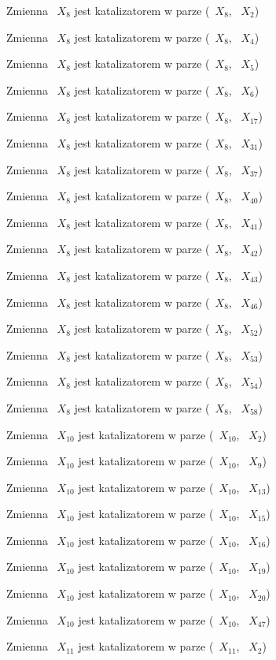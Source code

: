\documentclass{article}
\begin{document}
Zmienna ~$X_{8}$ jest katalizatorem w parze (~$X_{8}$, ~$X_{2}$)

Zmienna ~$X_{8}$ jest katalizatorem w parze (~$X_{8}$, ~$X_{4}$)

Zmienna ~$X_{8}$ jest katalizatorem w parze (~$X_{8}$, ~$X_{5}$)

Zmienna ~$X_{8}$ jest katalizatorem w parze (~$X_{8}$, ~$X_{6}$)

Zmienna ~$X_{8}$ jest katalizatorem w parze (~$X_{8}$, ~$X_{17}$)

Zmienna ~$X_{8}$ jest katalizatorem w parze (~$X_{8}$, ~$X_{31}$)

Zmienna ~$X_{8}$ jest katalizatorem w parze (~$X_{8}$, ~$X_{37}$)

Zmienna ~$X_{8}$ jest katalizatorem w parze (~$X_{8}$, ~$X_{40}$)

Zmienna ~$X_{8}$ jest katalizatorem w parze (~$X_{8}$, ~$X_{41}$)

Zmienna ~$X_{8}$ jest katalizatorem w parze (~$X_{8}$, ~$X_{42}$)

Zmienna ~$X_{8}$ jest katalizatorem w parze (~$X_{8}$, ~$X_{43}$)

Zmienna ~$X_{8}$ jest katalizatorem w parze (~$X_{8}$, ~$X_{46}$)

Zmienna ~$X_{8}$ jest katalizatorem w parze (~$X_{8}$, ~$X_{52}$)

Zmienna ~$X_{8}$ jest katalizatorem w parze (~$X_{8}$, ~$X_{53}$)

Zmienna ~$X_{8}$ jest katalizatorem w parze (~$X_{8}$, ~$X_{54}$)

Zmienna ~$X_{8}$ jest katalizatorem w parze (~$X_{8}$, ~$X_{58}$)

Zmienna ~$X_{10}$ jest katalizatorem w parze (~$X_{10}$, ~$X_{2}$)

Zmienna ~$X_{10}$ jest katalizatorem w parze (~$X_{10}$, ~$X_{9}$)

Zmienna ~$X_{10}$ jest katalizatorem w parze (~$X_{10}$, ~$X_{13}$)

Zmienna ~$X_{10}$ jest katalizatorem w parze (~$X_{10}$, ~$X_{15}$)

Zmienna ~$X_{10}$ jest katalizatorem w parze (~$X_{10}$, ~$X_{16}$)

Zmienna ~$X_{10}$ jest katalizatorem w parze (~$X_{10}$, ~$X_{19}$)

Zmienna ~$X_{10}$ jest katalizatorem w parze (~$X_{10}$, ~$X_{20}$)

Zmienna ~$X_{10}$ jest katalizatorem w parze (~$X_{10}$, ~$X_{47}$)

Zmienna ~$X_{11}$ jest katalizatorem w parze (~$X_{11}$, ~$X_{2}$)
\end{document}
